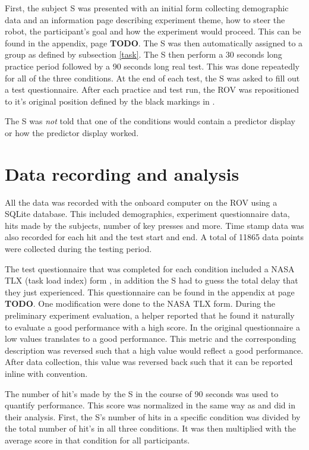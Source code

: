 First, the subject S was presented with an initial form collecting demographic data and an information page describing experiment theme, how to steer the robot, the participant's goal and how the experiment would proceed. This can be found in the appendix, page \textbf{TODO}. The S was then automatically assigned to a group as defined by subsection \ref{task}. The S then perform a 30 seconds long practice period followed by a 90 seconds long real test. This was done repeatedly for all of the three conditions. At the end of each test, the S was asked to fill out a test questionnaire.  After each practice and test run, the ROV was repositioned to it's original position defined by the black markings in .

The S was \emph{not} told that one of the conditions would contain a predictor display or how the predictor display worked.

\section{Data recording and analysis}

All the data was recorded with the onboard computer on the ROV using a SQLite database. This included demographics, experiment questionnaire data, hits made by the subjects, number of key presses and more. Time stamp data was also recorded for each hit and the test start and end. A total of 11865 data points were collected during the testing period.

The test questionnaire that was completed for each condition included a NASA TLX (task load index) form \citep{Hart1988}, in addition the S had to guess the total delay that they just experienced. This questionnaire can be found in the appendix at page \textbf{TODO}. One modification were done to the NASA TLX form. During the preliminary experiment evaluation, a helper reported that he found it naturally to evaluate a good performance with a high score. In the original questionnaire a low values translates to a good performance. This metric and the corresponding description was reversed such that a high value would reflect a good performance. After data collection, this value was reversed back such that it can be reported inline with convention.

The number of hit's made by the S in the course of 90 seconds was used to quantify performance. This score was normalized in the same way as \citep{Rachmielowski2010} and \citep{Lovi2014} did in their analysis. First, the S's number of hits in a specific condition was divided by the total number of hit's in all three conditions. It was then multiplied with the average score in that condition for all participants.

